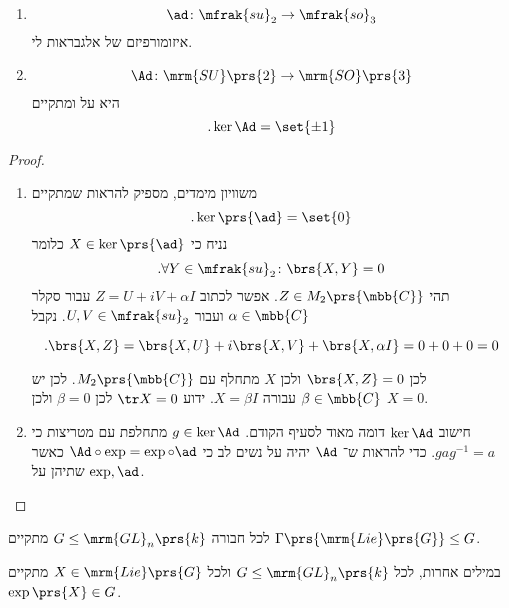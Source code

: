 \documentclass[10pt, twoside]{book}
\begin{document}
\begin{proposition}
\begin{enumerate}
\item
\[\ad \colon \mfrak{su}_2 \to \mfrak{so}_3\]
איזומורפיזם של אלגבראות לי.
\item
\[\Ad \colon \mrm{SU}\prs{2} \to \mrm{SO}\prs{3}\]
היא על ומתקיים
\[\text{.} \ker \Ad = \set{\pm 1}\]
\end{enumerate}
\end{proposition}

\begin{proof}
\begin{enumerate}
\item משוויון מימדים, מספיק להראות שמתקיים
\[\text{.} \ker \prs{\ad} = \set{0}\]
נניח כי
$X \in \ker \prs{\ad}$
כלומר
\[\text{.} \forall Y \in \mfrak{su}_2 \colon \brs{X,Y} = 0\]
תהי
$Z \in M_2\prs{\mbb{C}}$.
אפשר לכתוב
$Z = U + iV + \alpha I$
עבור סקלר
$\alpha \in \mbb{C}$
ועבור
$U,V \in \mfrak{su}_2$.
נקבל
\begin{otherlanguage}{english}
\[\text{.} \brs{X, Z} = \brs{X, U} + i \brs{X,V} + \brs{X, \alpha I} = 0+0+0 = 0\]
\end{otherlanguage}

לכן
$\brs{X,Z} = 0$
ולכן
$X$
מתחלף עם
$M_2\prs{\mbb{C}}$.
לכן יש
$\beta \in \mbb{C}$
עבורה
$X = \beta I$.
ידוע
$\tr X = 0$
לכן
$\beta = 0$
ולכן
$X = 0$.

\item
חישוב
$\ker \Ad$
דומה מאוד לסעיף הקודם.
$g \in \ker \Ad$
מתחלפת עם מטריצות כי
$g a g^{-1} = a$.
כדי להראות ש־%
$\Ad$
יהיה על נשים לב כי
$\Ad \circ \exp = \exp \circ \ad$
כאשר
$\exp, \ad$
שתיהן על.
\end{enumerate}
\end{proof}


\begin{theorem}
לכל חבורה
$G \leq \mrm{GL}_n\prs{k}$
מתקיים
$\Gamma\prs{\mrm{Lie}\prs{G}} \leq G$.

במילים אחרות, לכל
$G \leq \mrm{GL}_n\prs{k}$
ולכל
$X \in \mrm{Lie}\prs{G}$
מתקיים
$\exp\prs{X} \in G$.
\end{theorem}
\end{document}
